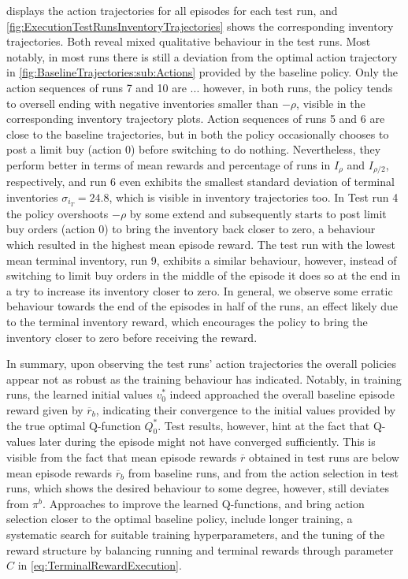 \documentclass[
    a4paper,
    11pt,
    bibliography=totoc,
    listof=totoc,      
    headinclude=true,
    cleardoublepage=empty,
]{scrbook}
\theoremstyle{plain}
\theoremstyle{definition}
\theoremstyle{remark}
\begin{document}
 displays the action 
trajectories for all episodes for each test run, and 
\cref{fig:ExecutionTestRunsInventoryTrajectories} shows the corresponding 
inventory trajectories. Both reveal mixed qualitative behaviour in the test 
runs. Most notably, in most runs there is still a deviation from the optimal 
action trajectory in \cref{fig:BaselineTrajectories:sub:Actions} provided by 
the baseline policy. Only the action sequences of runs 7 and 10 are ... however, in both runs, the policy tends to oversell ending with negative inventories smaller than $-\rho$, visible in the corresponding inventory trajectory plots. Action sequences of runs 5 and 6 are close to the baseline trajectories, but in both the policy occasionally chooses to post a limit buy (action 0) before switching to do nothing. Nevertheless, they perform better in terms of mean rewards and percentage of runs in $I_\rho$ and $I_{\rho/2}$, respectively, and run 6 even exhibits the smallest standard deviation of terminal inventories $\sigma_{i_T}=24.8$, which is visible in inventory trajectories too. In Test run 4 the policy overshoots $-\rho$ by some extend and subsequently starts to post limit buy orders (action  0) to bring the inventory back closer to zero, a behaviour which resulted in the highest mean episode reward. The test run with the lowest mean terminal inventory, run 9, exhibits a similar behaviour, however, instead of switching to limit buy orders in the middle of the episode it does so at the end in a try to increase its inventory closer to zero. In general, we observe some erratic behaviour towards the end of the episodes in half of the runs, an effect likely due to the terminal inventory reward, which encourages the policy to bring the inventory closer to zero before receiving the reward.

In summary, upon observing the test runs' action trajectories the overall 
policies appear not as robust as the training behaviour has indicated. 
Notably, in training runs, the learned initial values $v_0^*$ indeed 
approached the overall baseline episode reward given by $\overline r_b$, 
indicating their convergence to the initial values provided by the true 
optimal Q-function $Q^*_0$. Test results, however, hint at the fact that 
Q-values later during the episode might not have converged sufficiently. This 
is visible from the fact that mean episode rewards $\overline r$ obtained in 
test runs are below mean episode rewards $\overline r_b$ from baseline runs, 
and from the action selection in test runs, which shows the desired behaviour  
to some degree, however, still deviates from $\pi^b$. Approaches to improve 
the learned Q-functions, and bring action selection closer to the optimal 
baseline policy, include longer training, a systematic search for suitable 
training hyperparameters, and the tuning of the reward structure by balancing 
running and terminal rewards through parameter $C$ in 
\eqref{eq:TerminalRewardExecution}. 
\end{document}

